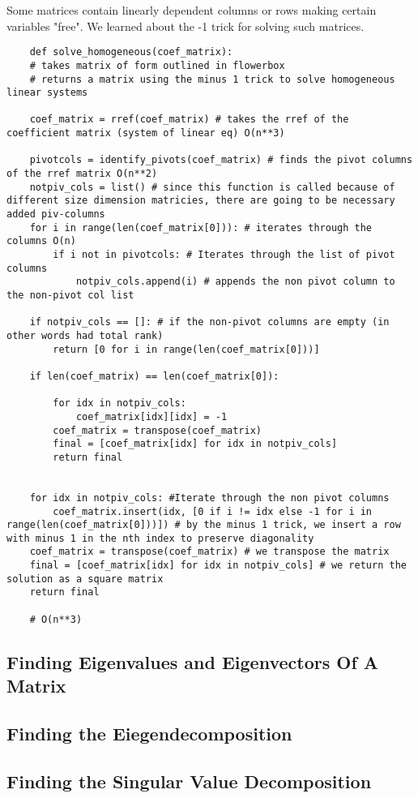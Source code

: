 \documentclass[12pt, a4paper]{article}
\begin{document}
Some matrices contain linearly dependent columns or rows making certain variables "free". We learned about the -1 trick for solving such matrices.
\begin{lstlisting}
    def solve_homogeneous(coef_matrix):
    # takes matrix of form outlined in flowerbox
    # returns a matrix using the minus 1 trick to solve homogeneous linear systems

    coef_matrix = rref(coef_matrix) # takes the rref of the coefficient matrix (system of linear eq) O(n**3)

    pivotcols = identify_pivots(coef_matrix) # finds the pivot columns of the rref matrix O(n**2)
    notpiv_cols = list() # since this function is called because of different size dimension matricies, there are going to be necessary added piv-columns
    for i in range(len(coef_matrix[0])): # iterates through the columns O(n)
        if i not in pivotcols: # Iterates through the list of pivot columns
            notpiv_cols.append(i) # appends the non pivot column to the non-pivot col list
    
    if notpiv_cols == []: # if the non-pivot columns are empty (in other words had total rank)
        return [0 for i in range(len(coef_matrix[0]))]

    if len(coef_matrix) == len(coef_matrix[0]):

        for idx in notpiv_cols:
            coef_matrix[idx][idx] = -1
        coef_matrix = transpose(coef_matrix)
        final = [coef_matrix[idx] for idx in notpiv_cols]
        return final


    for idx in notpiv_cols: #Iterate through the non pivot columns
        coef_matrix.insert(idx, [0 if i != idx else -1 for i in range(len(coef_matrix[0]))]) # by the minus 1 trick, we insert a row with minus 1 in the nth index to preserve diagonality
    coef_matrix = transpose(coef_matrix) # we transpose the matrix
    final = [coef_matrix[idx] for idx in notpiv_cols] # we return the solution as a square matrix  
    return final

    # O(n**3)
\end{lstlisting}

\subsection{Finding Eigenvalues and Eigenvectors Of A Matrix}

\subsection{Finding the Eiegendecomposition}

\subsection{Finding the Singular Value Decomposition}
\end{document}
